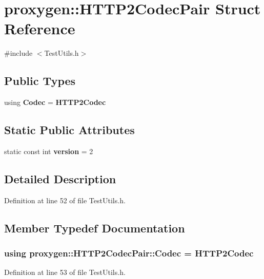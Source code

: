 \section{proxygen\+:\+:H\+T\+T\+P2\+Codec\+Pair Struct Reference}
\label{structproxygen_1_1HTTP2CodecPair}


{\ttfamily \#include $<$Test\+Utils.\+h$>$}

\subsection*{Public Types}
\begin{DoxyCompactItemize}
\item 
using {\bf Codec} = {\bf H\+T\+T\+P2\+Codec}
\end{DoxyCompactItemize}
\subsection*{Static Public Attributes}
\begin{DoxyCompactItemize}
\item 
static const int {\bf version} = 2
\end{DoxyCompactItemize}


\subsection{Detailed Description}


Definition at line 52 of file Test\+Utils.\+h.



\subsection{Member Typedef Documentation}
\subsubsection[{Codec}]{\setlength{\rightskip}{0pt plus 5cm}using {\bf proxygen\+::\+H\+T\+T\+P2\+Codec\+Pair\+::\+Codec} =  {\bf H\+T\+T\+P2\+Codec}}\label{structproxygen_1_1HTTP2CodecPair_a71f745693ed6cd271c804c0cd1c9b7f3}


Definition at line 53 of file Test\+Utils.\+h.



